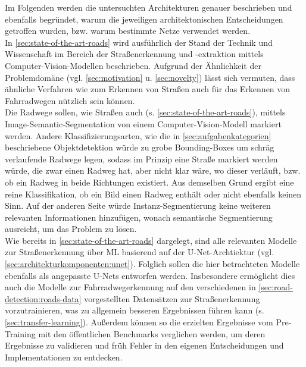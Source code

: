 Im Folgenden werden die untersuchten Architekturen genauer beschrieben und ebenfalls begründet, 
warum die jeweiligen architektonischen Entscheidungen getroffen wurden, bzw. warum bestimmte Netze verwendet werden. \\
In \autoref{sec:state-of-the-art-roads} wird ausführlich der Stand der Technik und Wissenschaft 
im Bereich der Straßenerkennung und -extraktion mittels Computer-Vision-Modellen beschrieben. 
Aufgrund der Ähnlichkeit der Problemdomäne (vgl. \autoref{sec:motivation} u. \autoref{sec:novelty}) 
lässt sich vermuten, dass ähnliche Verfahren wie 
zum Erkennen von Straßen auch für das Erkennen von Fahrradwegen nützlich sein können. 
\\
Die Radwege sollen, wie Straßen auch (s. \autoref{sec:state-of-the-art-roads}), 
mittels Image-Semantic-Segmentation von einem Computer-Vision-Modell 
markiert werden. Andere Klassifizierungsarten, wie die in \autoref{sec:aufgabenkategorien} beschriebene 
Objektdetektion würde zu grobe Bounding-Boxes um schräg verlaufende Radwege legen, sodass im Prinzip 
eine Straße markiert werden würde, die zwar einen Radweg hat, aber nicht klar wäre, wo dieser verläuft, 
bzw. ob ein Radweg in beide Richtungen existiert. Aus demselben Grund ergibt eine reine Klassifikation, 
ob ein Bild einen Radweg enthält oder nicht ebenfalls keinen Sinn. 
Auf der anderen Seite würde Instanz-Segmentierung keine weiteren relevanten Informationen hinzufügen, 
wonach semantische Segmentierung ausreicht, um das Problem zu lösen. \\
Wie bereits in \autoref{sec:state-of-the-art-roads} dargelegt, sind alle relevanten Modelle zur 
Straßenerkennung über \ac{ML} basierend auf der U-Net-Archtiektur (vgl. \ref{sec:architekturkomponenten:unet}).
Folglich sollen die hier betrachteten Modelle ebenfalls als angepasste U-Nets entworfen werden. 
Insbesondere ermöglicht dies auch die Modelle zur Fahrradwegerkennung auf den verschiedenen 
in \autoref{sec:road-detection:roads-data} vorgestellten Datensätzen zur Straßenerkennung vorzutrainieren, 
was zu allgemein besseren Ergebnissen führen kann (s. \autoref{sec:transfer-learning}). 
Außerdem können so die erzielten Ergebnisse vom Pre-Training mit den öffentlichen Benchmarks verglichen werden,
um deren Ergebnisse zu validieren und früh Fehler in den eigenen Entscheidungen und Implementationen zu entdecken.

\renewcommand{\labelenumii}{\theenumii}
\renewcommand{\theenumii}{\theenumi.\arabic{enumii}.}

